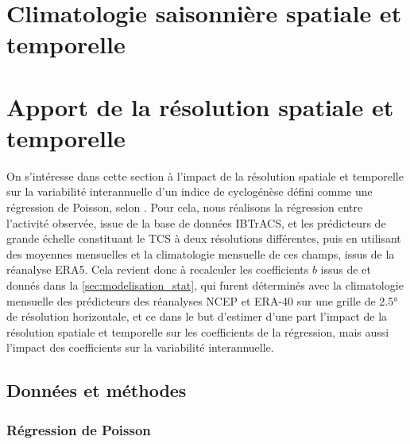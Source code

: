 \documentclass[../main.tex]{subfiles}
\begin{document}
\section{Climatologie saisonnière spatiale et temporelle}

\section{Apport de la résolution spatiale et temporelle}

On s'intéresse dans cette section à l'impact de la résolution spatiale et temporelle sur la variabilité interannuelle d'un indice de cyclogénèse défini comme
une régression de Poisson, selon \textcite{tippett_poisson_2011}. Pour cela, nous réalisons la régression entre l'activité observée, issue de la base de données
IBTrACS, et les prédicteurs de grande échelle constituant le TCS à deux résolutions différentes, puis en utilisant des moyennes mensuelles et la climatologie
mensuelle de ces champs, issus de la réanalyse ERA5. Cela revient donc à recalculer les coefficients $b$ issus de \textcite{tippett_poisson_2011} et donnés
dans la \cref{sec:modelisation_stat}, qui furent déterminés avec la climatologie mensuelle des prédicteurs des réanalyses NCEP
\parencite{kalnay_ncep_1996,kistler_ncep_2001} et ERA-40 \parencite{uppala_era40_2005} sur une grille de \ang{2.5} de résolution horizontale, et ce dans le but
d'estimer d'une part l'impact de la résolution spatiale et temporelle sur les coefficients de la régression, mais aussi l'impact des coefficients sur la
variabilité interannuelle.

\subsection{Données et méthodes}

\subsubsection*{Régression de Poisson}\label{sec:regression_poisson}
\end{document}
